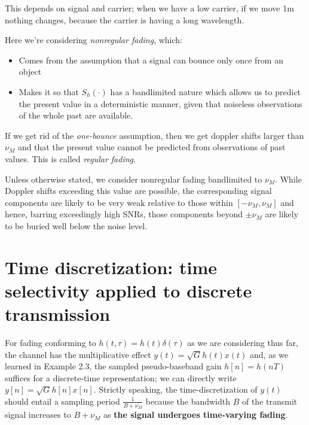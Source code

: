 \documentclass[a4paper, 12pt]{book}
\begin{document}

This depends on signal and carrier; when we have a low carrier, if we move 1m nothing changes, because the carrier is having a long wavelength.

Here we're considering \textit{nonregular fading}, which:

\begin{itemize}
    \item Comes from the assumption that a signal can bounce only once from an object
    \item Makes it so that $S_h(\cdot)$ has a bandlimited nature which allows us to predict the present value in a deterministic manner, given that noiseless observations of the whole past are available.
\end{itemize}

If we get rid of the \textit{one-bounce} assumption, then we get doppler shifts larger than $\nu_M$ and that the present value cannot be predicted from observations of past values. This is called \textit{regular fading}.

\begin{yellowbox}
Unless otherwise stated, we consider nonregular fading bandlimited to $\nu_M$. While Doppler shifts exceeding this value are possible, the corresponding signal components are likely to be very weak relative to those within $[-\nu_M, \nu_M]$ and hence, barring exceedingly high SNRs, those components beyond $\pm \nu_M$ are likely to be buried well below the noise level.
\end{yellowbox}

\section{Time discretization: time selectivity applied to discrete transmission}

\begin{yellowbox}
For fading conforming to $h(t, \tau) = h(t)\delta(\tau)$ as we are considering thus far, the channel has the multiplicative effect $y(t) = \sqrt{G} h(t) x(t)$ and, as we learned in Example 2.3, the sampled pseudo-baseband gain $h[n] = h(nT)$ suffices for a discrete-time representation; we can directly write $y[n] = \sqrt{G} h[n] x[n]$. Strictly speaking, the time-discretization of $y(t)$ should entail a sampling period $\frac{1}{B + \nu_M}$ because the bandwidth $B$ of the transmit signal increases to $B + \nu_M$ as \textbf{the signal undergoes time-varying fading}.
\end{yellowbox}
\end{document}
